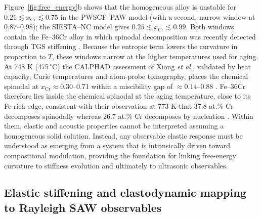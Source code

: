 \documentclass[final,3p,times]{elsarticle}
\begin{document}
Figure~\ref{fig:free_energy}b shows that the homogeneous alloy is unstable for $0.21 \lesssim x_{\mathrm{Cr}} \lesssim 0.75$ in the PWSCF--PAW model (with a second, narrow window at $0.87$--$0.98$); the SIESTA--NC model gives $0.25 \lesssim x_{\mathrm{Cr}} \lesssim 0.99$. Both windows contain the Fe--36Cr alloy in which spinodal decomposition was recently detected through TGS stiffening \cite{rae2026tgs}. Because the entropic term lowers the curvature in proportion to $T$, these windows narrow at the higher temperatures used for aging. At 748 K (475\,$^\circ$C) the CALPHAD assessment of Xiong \textit{et al.}, validated by heat capacity, Curie temperatures and atom-probe tomography, places the chemical spinodal at $x_{\mathrm{Cr}}\approx0.30$--0.71 within a miscibility gap of $\approx0.14$--0.88 \cite{xiong2011improved}. Fe--36Cr therefore lies inside the chemical spinodal at the aging temperature, close to its Fe-rich edge, consistent with their observation at 773 K that 37.8 at.\% Cr decomposes spinodally whereas 26.7 at.\% Cr decomposes by nucleation \cite{xiong2011improved}. Within them, elastic and acoustic properties cannot be interpreted assuming a homogeneous solid solution. Instead, any observable elastic response must be understood as emerging from a system that is intrinsically driven toward compositional modulation, providing the foundation for linking free-energy curvature to stiffness evolution and ultimately to ultrasonic observables.

\subsection{Elastic stiffening and elastodynamic mapping to Rayleigh SAW observables}
\end{document}
